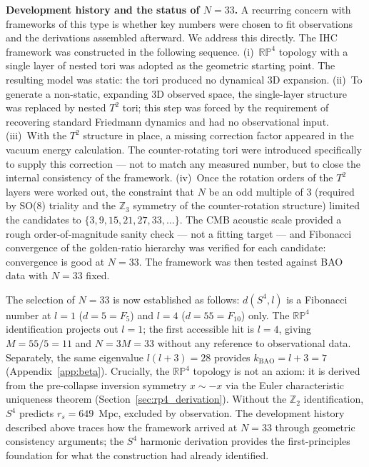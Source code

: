 \documentclass[12pt,a4paper]{article}
\begin{document}
\textbf{Development history and the status of $N = 33$.}
A recurring concern with frameworks of this type is whether key numbers were chosen
to fit observations and the derivations assembled afterward.  We address this directly.
The IHC framework was constructed in the following sequence.
(i)~$\mathbb{RP}^4$ topology with a single layer of nested tori was adopted as the
geometric starting point.  The resulting model was static: the tori produced no
dynamical 3D expansion.
(ii)~To generate a non-static, expanding 3D observed space, the single-layer structure
was replaced by nested $T^2$ tori; this step was forced by the requirement of
recovering standard Friedmann dynamics and had no observational input.
(iii)~With the $T^2$ structure in place, a missing correction factor appeared in the
vacuum energy calculation.  The counter-rotating tori were introduced specifically
to supply this correction --- not to match any measured number, but to close
the internal consistency of the framework.
(iv)~Once the rotation orders of the $T^2$ layers were worked out, the constraint that
$N$ be an odd multiple of 3 (required by SO(8) triality and the $\mathbb{Z}_3$
symmetry of the counter-rotation structure) limited the candidates to
$\{3, 9, 15, 21, 27, 33, \ldots\}$.  The CMB acoustic scale provided a rough order-of-magnitude sanity check --- not a fitting target --- and Fibonacci convergence of the golden-ratio hierarchy was verified for each candidate: convergence is good at $N = 33$.  The framework was
then tested against BAO data with $N = 33$ fixed.

The selection of $N = 33$ is now established as follows: $d(S^4,l)$ is a
Fibonacci number at $l=1$ ($d=5=F_5$) and $l=4$ ($d=55=F_{10}$) only.
The $\mathbb{RP}^4$ identification projects out $l=1$; the first accessible
hit is $l=4$, giving $M = 55/5 = 11$ and $N = 3M = 33$ without
any reference to observational data. Separately, the same eigenvalue $l(l+3)=28$
provides $k_\mathrm{BAO} = l+3 = 7$ (Appendix~\ref{app:beta}). Crucially, the
$\mathbb{RP}^4$ topology is not an axiom: it is derived from the pre-collapse
inversion symmetry $x \sim -x$ via the Euler characteristic uniqueness theorem
(Section~\ref{sec:rp4_derivation}). Without the $\mathbb{Z}_2$ identification,
$S^4$ predicts $r_s = 649$~Mpc, excluded by observation.
The development history described above traces how the framework arrived at $N=33$
through geometric consistency arguments; the $S^4$ harmonic derivation provides
the first-principles foundation for what the construction had already identified.
\end{document}

